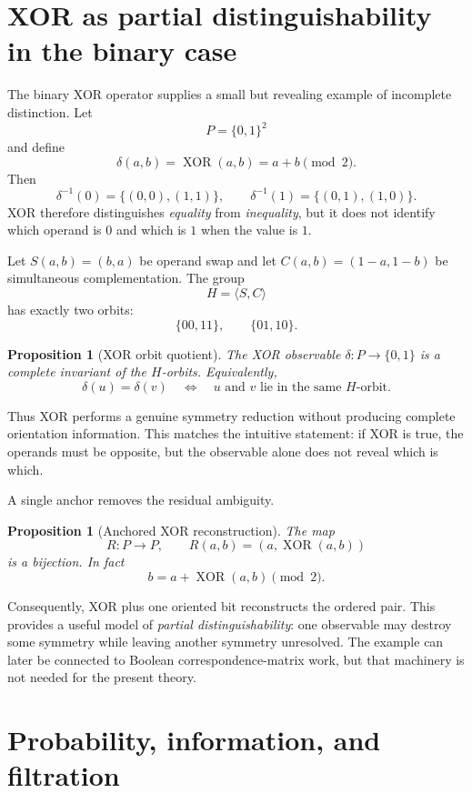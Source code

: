 \documentclass[11pt]{article}
\newtheorem{proposition}[theorem]{Proposition}
\theoremstyle{definition}
\theoremstyle{remark}
\newcommand{\XOR}{\operatorname{XOR}}
\begin{document}
\section{XOR as partial distinguishability in the binary case}

The binary XOR operator supplies a small but revealing example of incomplete distinction.  Let
\[
P=\{0,1\}^2
\]
and define
\[
\delta(a,b)=\XOR(a,b)=a+b\pmod 2.
\]
Then
\[
\delta^{-1}(0)=\{(0,0),(1,1)\},
\qquad
\delta^{-1}(1)=\{(0,1),(1,0)\}.
\]
XOR therefore distinguishes \emph{equality} from \emph{inequality}, but it does not identify which operand is $0$ and which is $1$ when the value is $1$.

Let $S(a,b)=(b,a)$ be operand swap and let $C(a,b)=(1-a,1-b)$ be simultaneous complementation.  The group
\[
H=\langle S,C\rangle
\]
has exactly two orbits:
\[
\{00,11\},\qquad\{01,10\}.
\]

\begin{proposition}[XOR orbit quotient]\label{prop:xor}
The XOR observable $\delta:P\to\{0,1\}$ is a complete invariant of the $H$-orbits.  Equivalently,
\[
\delta(u)=\delta(v)
\quad\Longleftrightarrow\quad
 u\text{ and }v\text{ lie in the same }H\text{-orbit}.
\]
\end{proposition}

Thus XOR performs a genuine symmetry reduction without producing complete orientation information.  This matches the intuitive statement: if XOR is true, the operands must be opposite, but the observable alone does not reveal which is which.

A single anchor removes the residual ambiguity.

\begin{proposition}[Anchored XOR reconstruction]\label{prop:xoranchor}
The map
\[
R:P\to P,
\qquad
R(a,b)=(a,\XOR(a,b))
\]
is a bijection.  In fact
\[
b=a+\XOR(a,b)\pmod 2.
\]
\end{proposition}

Consequently, XOR plus one oriented bit reconstructs the ordered pair.  This provides a useful model of \emph{partial distinguishability}: one observable may destroy some symmetry while leaving another symmetry unresolved.  The example can later be connected to Boolean correspondence-matrix work, but that machinery is not needed for the present theory.

\section{Probability, information, and filtration}
\end{document}
